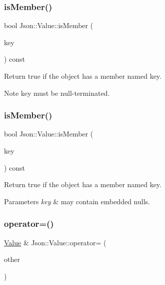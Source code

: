 \subsubsection{\texorpdfstring{is\+Member()}{isMember()}\hspace{0.1cm}{\footnotesize\ttfamily [1/2]}}
{\footnotesize\ttfamily bool Json\+::\+Value\+::is\+Member (\begin{DoxyParamCaption}\item[{const char $\ast$}]{key }\end{DoxyParamCaption}) const}

Return true if the object has a member named key. \begin{DoxyNote}{Note}
\textquotesingle{}key\textquotesingle{} must be null-\/terminated. 
\end{DoxyNote}
\mbox{\label{classJson_1_1Value_a0c2cd838217b23ee6bde8135de1b30d9}} 
\subsubsection{\texorpdfstring{is\+Member()}{isMember()}\hspace{0.1cm}{\footnotesize\ttfamily [2/2]}}
{\footnotesize\ttfamily bool Json\+::\+Value\+::is\+Member (\begin{DoxyParamCaption}\item[{const J\+S\+O\+N\+C\+P\+P\+\_\+\+S\+T\+R\+I\+NG \&}]{key }\end{DoxyParamCaption}) const}

Return true if the object has a member named key. 
\begin{DoxyParams}{Parameters}
{\em key} & may contain embedded nulls. \\
\hline
\end{DoxyParams}
\mbox{\label{classJson_1_1Value_a795acb28772da4c5d85ae8f4af36c69f}} 
\subsubsection{\texorpdfstring{operator=()}{operator=()}}
{\footnotesize\ttfamily \hyperlink{classJson_1_1Value}{Value} \& Json\+::\+Value\+::operator= (\begin{DoxyParamCaption}\item[{\hyperlink{classJson_1_1Value}{Value}}]{other }\end{DoxyParamCaption})}

